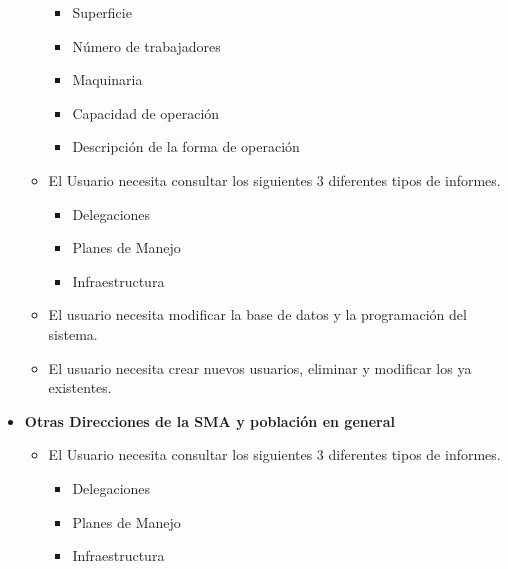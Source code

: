 \begin{itemize}
\begin{itemize}
\begin{itemize}
			\item Superficie 
			\item Número de trabajadores
			\item Maquinaria
			\item Capacidad de operación 
			\item Descripción de la forma de operación
		\end{itemize}
		\item El Usuario necesita consultar los siguientes 3 diferentes tipos de informes.
		\begin{itemize}
			\item Delegaciones
			\item Planes de Manejo
			\item Infraestructura
		\end{itemize}
		\item El usuario necesita modificar la base de datos y la programación del sistema.
		\item El usuario necesita crear nuevos usuarios, eliminar y modificar los ya existentes.
	\end{itemize}
	\item \textbf{Otras Direcciones de la SMA y población en general}
	\begin{itemize}
		\item El Usuario necesita consultar los siguientes 3 diferentes tipos de informes.
		\begin{itemize}
			\item Delegaciones
			\item Planes de Manejo
			\item Infraestructura
		\end{itemize}
	\end{itemize}
\end{itemize}

